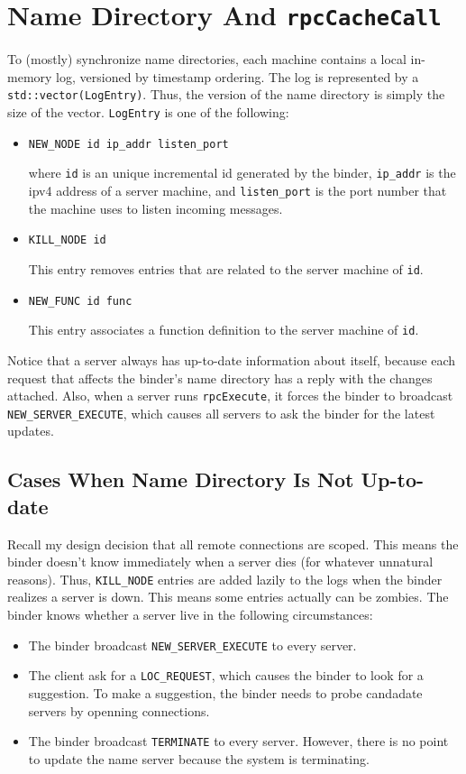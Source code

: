 \section{Name Directory And {\tt rpcCacheCall}}
To (mostly) synchronize name directories, each machine contains a local in-memory log, versioned by timestamp ordering.
The log is represented by a {\tt std::vector(LogEntry)}.
Thus, the version of the name directory is simply the size of the vector.
{\tt LogEntry} is one of the following:

\begin{itemize}
\item
\begin{verbatim}
NEW_NODE id ip_addr listen_port
\end{verbatim}
where {\tt id} is an unique incremental id generated by the binder, {\tt ip\_addr} is the ipv4 address of a server machine, and {\tt listen\_port} is the port number that the machine uses to listen incoming messages.
\item
\begin{verbatim}
KILL_NODE id
\end{verbatim}
This entry removes entries that are related to the server machine of {\tt id}.
\item
\begin{verbatim}
NEW_FUNC id func
\end{verbatim}
This entry associates a function definition to the server machine of {\tt id}.
\end{itemize}

Notice that a server always has up-to-date information about itself, because each request that affects the binder's name directory has a reply with the changes attached.
Also, when a server runs {\tt rpcExecute}, it forces the binder to broadcast {\tt NEW\_SERVER\_EXECUTE}, which causes all servers to ask the binder for the latest updates.

\subsection{Cases When Name Directory Is Not Up-to-date}
Recall my design decision that all remote connections are scoped.
This means the binder doesn't know immediately when a server dies (for whatever unnatural reasons).
Thus, {\tt KILL\_NODE} entries are added lazily to the logs when the binder realizes a server is down.
This means some entries actually can be zombies.
The binder knows whether a server live in the following circumstances:
\begin{itemize}
\item
The binder broadcast {\tt NEW\_SERVER\_EXECUTE} to every server.
\item
The client ask for a {\tt LOC\_REQUEST}, which causes the binder to look for a suggestion.
To make a suggestion, the binder needs to probe candadate servers by openning connections.
\item
The binder broadcast {\tt TERMINATE} to every server.
However, there is no point to update the name server because the system is terminating.
\end{itemize}


